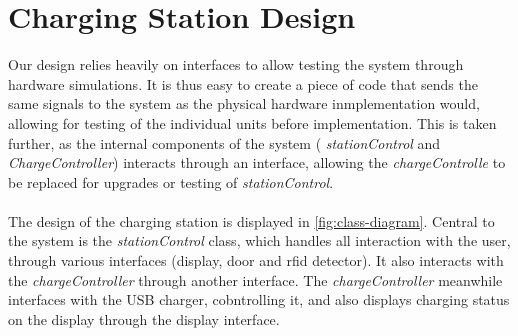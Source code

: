 \section{Charging Station Design}

Our design relies heavily on interfaces to allow testing the system through hardware simulations. It is thus easy to create a piece of code that sends the same signals to the system as the physical hardware inmplementation would, allowing for testing of the individual units before implementation. This is taken further, as the internal components of the system ( \textit{stationControl} and \textit{ChargeController}) interacts through an interface, allowing the \textit{chargeControlle} to be replaced for upgrades or testing of \textit{stationControl}.
\\
\\
The design of the charging station is displayed in \autoref{fig:class-diagram}. Central to the system is the \textit{stationControl} class, which handles all interaction with the user, through various interfaces (display, door and rfid detector). It also interacts with the \textit{chargeController} through another interface. The \textit{chargeController} meanwhile interfaces with the USB charger, cobntrolling it, and also displays charging status on the display through the display interface. 


